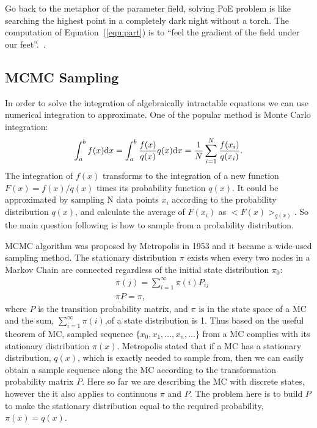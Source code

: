 	Go back to the metaphor of the parameter field, solving PoE problem is like searching the highest point in a completely dark night without a torch.
	The computation of Equation~(\ref{equ:part}) is to ``feel the gradient of the field under our feet''.~\cite{woodfordnotes}.
\subsection{MCMC Sampling}
	\label{sec:mcmc}
	In order to solve the integration of algebraically intractable equations we can use numerical integration to approximate.
	One of the popular method is Monte Carlo integration:
	\begin{equation}
	\int_{a}^{b} f(x) \mathrm{d} x = \int_{a}^{b}\frac{f(x)}{q(x)}q(x)\mathrm{d} x = \dfrac{1}{N}\sum_{i=1}^{N}\frac{f(x_i)}{q(x_i)}.
	\end{equation}
	The integration of $ f(x) $ transforms to the integration of a new function $ F(x) = f(x)/q(x)  $ times its probability function $ q(x) $.
	It could be approximated by sampling N data points $ x_i $ according to the probability distribution $ q(x) $, and calculate the average of $ F(x_i) $ as $ <F(x)>_{q(x)}$.
	So the main question following is how to sample from a probability distribution.
	
	MCMC algorithm was proposed by Metropolis in 1953 and it became a wide-used sampling method.
	The stationary distribution $ \pi $ exists when every two nodes in a Markov Chain are connected regardless of the initial state distribution $ \pi_0 $:
	\begin{equation}
	\begin{aligned}
		&\pi(j) = \sum_{i=1}^{\infty}\pi(i)P_{ij} \\
		&\pi P = \pi,
	\end{aligned}
	\end{equation}
	where $ P $ is the transition probability matrix, and $ \pi $ is in the state space of a MC and the sum, $ \sum_{i=1}^{\infty}\pi(i) $,of a state distribution is 1.
	Thus based on the useful theorem of MC, sampled sequence $ \{x_0, x_1, ..., x_n, ... \}$ from a MC complies with its stationary distribution $ \pi(x) $.
	Metropolis stated that if a MC has a stationary distribution, $ q(x) $, which is exactly needed to sample from, then we can easily obtain a sample sequence along the MC according to the transformation probability matrix $ P $.
	Here so far we are describing the MC with discrete states, however the it also applies to continuous $ \pi $ and $ P $.
	The problem here is to build $ P $ to make the stationary distribution equal to the required probability, $ \pi(x) = q(x) $.
	
